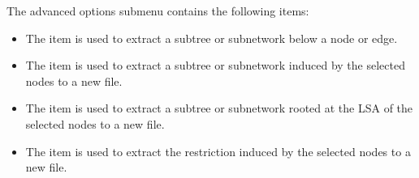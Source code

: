 \documentclass[11pt]{article}
\begin{document}
{\small
The advanced options submenu contains the following items:
\begin{itemize}
\item The  item is used to extract a subtree or subnetwork below a node or edge.
\item The  item is used to extract a  subtree or subnetwork induced by the selected nodes to a new file.
\item The  item is used to extract a  subtree or subnetwork rooted at the LSA of the selected nodes to a new file.
\item The  item is used to extract the restriction induced by the  selected nodes to a new file.
\end{itemize}
}

\end{document}
